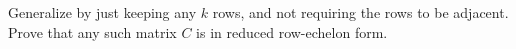 Generalize  by just keeping any $k$ rows, and not requiring the rows to be adjacent.  Prove that any such matrix $C$ is in reduced row-echelon form.